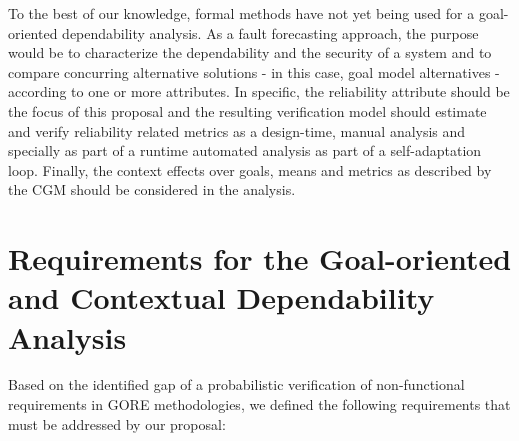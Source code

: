 To the best of our knowledge, formal methods have not yet being used for a goal-oriented dependability analysis. As a fault forecasting approach, the purpose would be to characterize the dependability and the security of a system and to compare concurring alternative solutions - in this case, goal model alternatives - according to one or more attributes. In specific, the reliability attribute should be the focus of this proposal and the resulting verification model should estimate and verify reliability related metrics as a design-time, manual analysis and specially as part of a runtime automated analysis as part of a self-adaptation loop. Finally, the context effects over goals, means and metrics as described by the CGM should be considered in the analysis.




\section{Requirements for the Goal-oriented and Contextual Dependability Analysis}

Based on the identified gap of a probabilistic verification of non-functional requirements in GORE methodologies, we defined the following requirements that must be addressed by our proposal:

